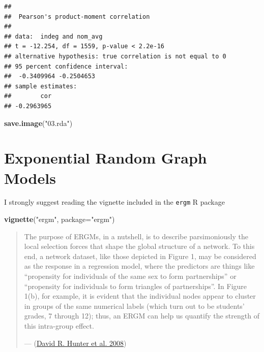 \documentclass[
]{book}
\newenvironment{Shaded}{\begin{snugshade}}{\end{snugshade}}
\newcommand{\AttributeTok}[1]{\textcolor[rgb]{0.13,0.29,0.53}{#1}}
\newcommand{\FunctionTok}[1]{\textcolor[rgb]{0.13,0.29,0.53}{\textbf{#1}}}
\newcommand{\NormalTok}[1]{#1}
\newcommand{\StringTok}[1]{\textcolor[rgb]{0.31,0.60,0.02}{#1}}
\begin{document}
\begin{verbatim}
## 
##  Pearson's product-moment correlation
## 
## data:  indeg and nom_avg
## t = -12.254, df = 1559, p-value < 2.2e-16
## alternative hypothesis: true correlation is not equal to 0
## 95 percent confidence interval:
##  -0.3409964 -0.2504653
## sample estimates:
##        cor 
## -0.2963965
\end{verbatim}

\begin{Shaded}
\begin{Highlighting}[]
\FunctionTok{save.image}\NormalTok{(}\StringTok{"03.rda"}\NormalTok{)}
\end{Highlighting}
\end{Shaded}

\hypertarget{exponential-random-graph-models}{%
\chapter{Exponential Random Graph Models}\label{exponential-random-graph-models}}

I strongly suggest reading the vignette included in the \texttt{ergm} R package

\begin{Shaded}
\begin{Highlighting}[]
\FunctionTok{vignette}\NormalTok{(}\StringTok{"ergm"}\NormalTok{, }\AttributeTok{package=}\StringTok{"ergm"}\NormalTok{)}
\end{Highlighting}
\end{Shaded}

\begin{quote}
The purpose of ERGMs, in a nutshell, is to describe parsimoniously the local selection forces that shape the global structure of a network. To this end, a network dataset, like those depicted in Figure 1, may be considered as the response in a regression model, where the predictors are things like ``propensity for individuals of the same sex to form partnerships'' or ``propensity for individuals to form triangles of partnerships''. In Figure 1(b), for example, it is evident that the individual nodes appear to cluster in groups of the same numerical labels (which turn out to be students' grades, 7 through 12); thus, an ERGM can help us quantify the strength of this intra-group effect.

--- (\protect\hyperlink{ref-Hunter2008}{David R. Hunter et al. 2008})
\end{quote}
\end{document}
